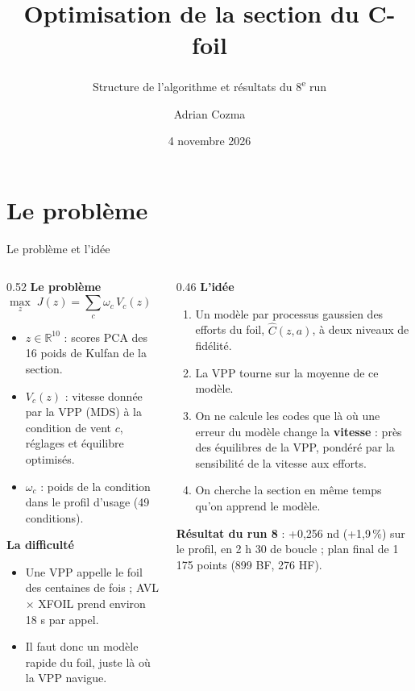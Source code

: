\documentclass[aspectratio=169,10pt]{beamer}
\title{Optimisation de la section du C-foil}
\subtitle{Structure de l'algorithme et résultats du 8\textsuperscript{e} run}
\author{Adrian Cozma}
\date{4 novembre 2026}
\begin{document}
\begin{frame}
\titlepage
\end{frame}

\section{Le problème}
\begin{frame}{Le problème et l'idée}
\begin{columns}[T]
\begin{column}{0.52\textwidth}
\small
\textbf{Le problème}
\[
  \max_{z}\; J(z) = \sum_{c} \omega_c\, V_c(z)
  \quad\text{sous}\quad I_{xx}(z) \ge I_{xx}^{\text{actuelle}}
\]
\begin{itemize}\setlength{\itemsep}{1pt}
  \item $z \in \mathbb R^{10}$ : scores PCA des 16 poids de Kulfan de la section.
  \item $V_c(z)$ : vitesse donnée par la VPP (MDS) à la condition de vent $c$, réglages et équilibre
        optimisés.
  \item $\omega_c$ : poids de la condition dans le profil d'usage (49 conditions).
\end{itemize}

\textbf{La difficulté}
\begin{itemize}\setlength{\itemsep}{1pt}
  \item Une VPP appelle le foil des centaines de fois ; AVL $\times$ XFOIL prend environ 18 s par appel.
  \item Il faut donc un modèle rapide du foil, juste là où la VPP navigue.
\end{itemize}
\end{column}
\begin{column}{0.46\textwidth}
\small
\textbf{L'idée}
\begin{enumerate}\setlength{\itemsep}{2pt}
  \item Un modèle par processus gaussien des efforts du foil, $\hat C(z, a)$, à deux niveaux de fidélité.
  \item La VPP tourne sur la moyenne de ce modèle.
  \item On ne calcule les codes que là où une erreur du modèle change la \textbf{vitesse} : près des
        équilibres de la VPP, pondéré par la sensibilité de la vitesse aux efforts.
  \item On cherche la section en même temps qu'on apprend le modèle.
\end{enumerate}

\medskip
\textbf{Résultat du run 8} : +0,256 nd (+1,9\,\%) sur le profil, en 2 h 30 de boucle ; plan final de 1\,175 points (899 BF, 276 HF).
\end{column}
\end{columns}
\end{frame}
\end{document}
